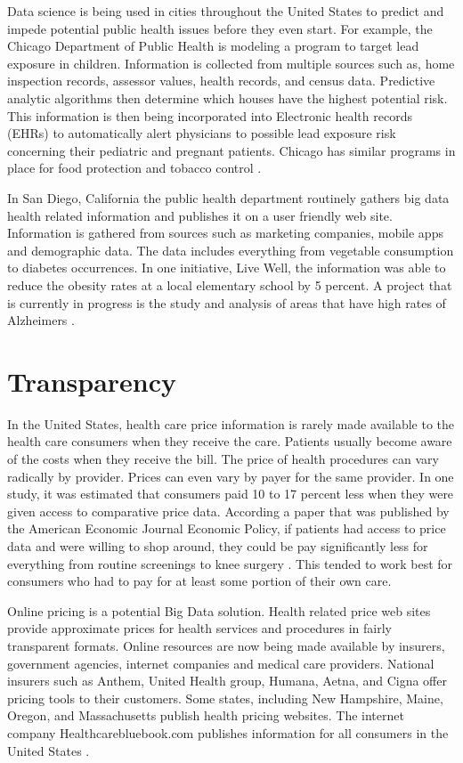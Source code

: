 \documentclass[sigconf]{acmart}
\begin{document}
Data science is being used in cities throughout the United States to predict and impede potential public health issues before they even start.  For example, the Chicago Department of Public Health is modeling a program to target lead exposure in children.  Information is collected from multiple sources such as, home inspection records, assessor values, health records, and census data.  Predictive analytic algorithms then determine which houses have the highest potential risk.  This information is then being incorporated into Electronic health records (EHRs) to automatically alert physicians to possible lead exposure risk concerning their pediatric and pregnant patients.  Chicago has similar programs in place for food protection and tobacco control \cite{www-google-chicago}.

In San Diego, California the public health department routinely gathers big data health related information and publishes it on a user friendly web site. Information is gathered from sources such as marketing companies, mobile apps and demographic data.  The data includes everything from vegetable consumption to diabetes occurrences.  In one initiative, Live Well, the information was able to reduce the obesity rates at a local elementary school by 5 percent. A project that is currently in progress is the study and analysis of areas that have high rates of Alzheimers \cite{www-google-sandiego}. 


\section{Transparency}
In the United States, health care price information is rarely made available to the health care consumers when they receive the care. Patients usually become aware of the costs when they receive the bill. The price of health procedures can vary radically by provider. Prices can even vary by payer for the same provider.  In one study, it was estimated that consumers paid 10 to 17 percent less when they were given access to comparative price data.  According a paper that was published by the American Economic Journal Economic Policy, if patients had access to price data and were willing to shop around, they could be pay significantly less for everything from routine screenings to knee surgery \cite{www-google-transparent}.  This tended to work best for consumers who had to pay for at least some portion of their own care. 

Online pricing is a potential Big Data solution.  Health related price web sites provide approximate prices for health services and procedures in fairly transparent formats. Online resources are now being made available by insurers, government agencies, internet companies and medical care providers. National insurers such as Anthem, United Health group, Humana, Aetna, and Cigna offer pricing tools to their customers. Some states, including New Hampshire, Maine, Oregon, and Massachusetts publish health pricing websites.  The internet company Healthcarebluebook.com publishes information for all consumers in the United States \cite{www-google-wall}.  
\end{document}
